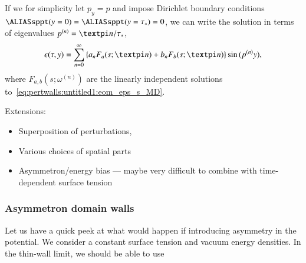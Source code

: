 \begin{draft}
        If we for simplicity let $p_y=p$ and impose Dirichlet boundary conditions $\sppt(y=0)=\sppt(y=\tau_\ast)=0$, we can write the solution in terms of eigenvalues $p^{(n)}= \ppi n/\tau_\ast$, 
        \begin{equation}
            \epsilon(\tau, y) = \sum_{n=0}^{\infty} \cclosed{ a_n F_a(s; \ppi n ) + b_n F_b(s; \ppi n)} \sin{ (p^{(n)}y)},
        \end{equation}
        where $F_{a,b}(s; \omega^{(n)})$ are the linearly independent solutions to~\cref{eq:pertwalls:untitled1:eom_eps_s_MD}.


    \begin{bullets}
        \item Extensions: \begin{itemize}
            \item Superposition of perturbations, 
            \item Various choices of spatial parts
            \item Asymmetron/energy bias --- maybe very difficult to combine with time-dependent surface tension
        \end{itemize}  
    \end{bullets}


        


    \subsubsection{Asymmetron domain walls}
        Let us have a quick peek at what would happen if introducing asymmetry in the potential. We consider a constant surface tension and vacuum energy densities. In the thin-wall limit, we should be able to use 

\end{draft}












